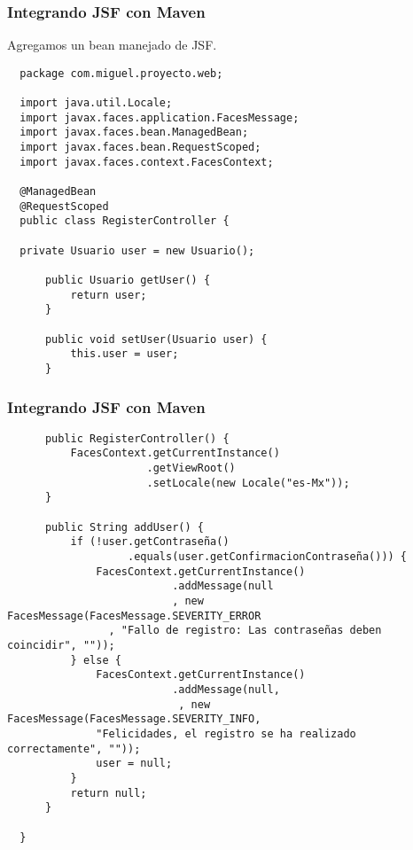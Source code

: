 \documentclass{beamer}
\begin{document}
\begin{frame}[fragile]
  \frametitle{Integrando JSF con Maven}

  Agregamos un bean manejado de JSF.

  \begin{verbatim}
  package com.miguel.proyecto.web;

  import java.util.Locale;
  import javax.faces.application.FacesMessage;
  import javax.faces.bean.ManagedBean;
  import javax.faces.bean.RequestScoped;
  import javax.faces.context.FacesContext;

  @ManagedBean
  @RequestScoped
  public class RegisterController {

  private Usuario user = new Usuario();

      public Usuario getUser() {
          return user;
      }

      public void setUser(Usuario user) {
          this.user = user;
      }

  \end{verbatim}
\end{frame}

\begin{frame}[fragile]
  \frametitle{Integrando JSF con Maven}
  \begin{verbatim}
      public RegisterController() {
          FacesContext.getCurrentInstance()
                      .getViewRoot()
                      .setLocale(new Locale("es-Mx"));
      }

      public String addUser() {
          if (!user.getContraseña()
                   .equals(user.getConfirmacionContraseña())) {
              FacesContext.getCurrentInstance()
                          .addMessage(null
                          , new FacesMessage(FacesMessage.SEVERITY_ERROR
                , "Fallo de registro: Las contraseñas deben coincidir", ""));
          } else {
              FacesContext.getCurrentInstance()
                          .addMessage(null,
                           , new FacesMessage(FacesMessage.SEVERITY_INFO,
              "Felicidades, el registro se ha realizado correctamente", ""));
              user = null;
          }
          return null;
      }

  }
  \end{verbatim}
\end{frame}
\end{document}
